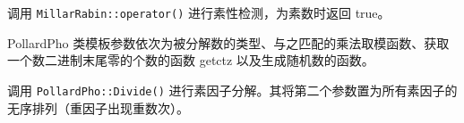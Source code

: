 调用 \texttt{MillarRabin::operator()} 进行素性检测，为素数时返回 true。

PollardPho 类模板参数依次为被分解数的类型、与之匹配的乘法取模函数、获取一个数二进制末尾零的个数的函数 getctz 以及生成随机数的函数。

调用 \texttt{PollardPho::Divide()} 进行素因子分解。其将第二个参数置为所有素因子的无序排列（重因子出现重数次）。
